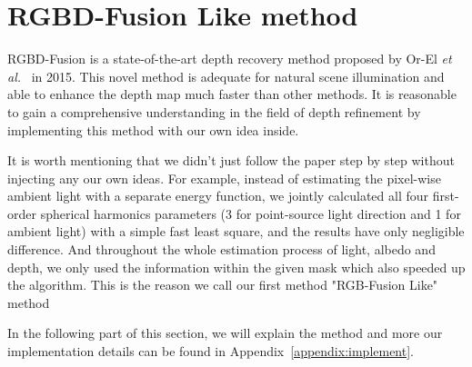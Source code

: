 \section{RGBD-Fusion Like method}
RGBD-Fusion is a state-of-the-art depth recovery method proposed by Or-El \emph{et al.}~\cite{or2015rgbd} in 2015.
This novel method is adequate for natural scene illumination and able to enhance the depth map much faster than other methods.
It is reasonable to gain a comprehensive understanding in the field of depth refinement by implementing this method with our own idea inside.

It is worth mentioning that we didn't just follow the paper step by step without injecting any our own ideas.
For example, instead of estimating the pixel-wise ambient light with a separate energy function, we jointly calculated all four first-order spherical harmonics parameters (3 for point-source light direction and 1 for ambient light) with a simple fast least square, and the results have only negligible difference.
And throughout the whole estimation process of light, albedo and depth, we only used the information within the given mask which also speeded up the algorithm.
This is the reason we call our first method "RGB-Fusion Like" method

In the following part of this section, we will explain the method and more our implementation details can be found in Appendix~\ref{appendix:implement}.


